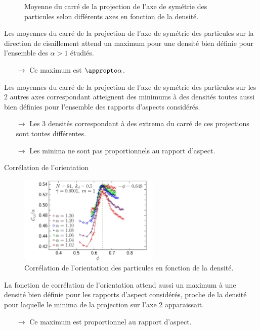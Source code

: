 \documentclass{beamer}
\begin{document}
\begin{figure}[h!]
\begin{subfigure}[t]{0.32\textwidth}
    \end{subfigure}
	\caption{Moyenne du carré de la projection de l'axe de symétrie des particules selon différents axes en fonction de la densité.}
\end{figure}
\vspace{-20pt}
Les moyennes du carré de la projection de l’axe de symétrie des particules sur la direction de cisaillement attend un maximum pour une densité bien définie pour l’ensemble des $\alpha>1$ étudiés.
\begin{itemize}
    \item[$\rightarrow$] Ce maximum est $\appropto \alpha$.
\end{itemize}
Les moyennes du carré de la projection de l’axe de symétrie des particules sur les 2 autres axes correspondant atteignent des minimums à des densités toutes aussi bien définies pour l’ensemble des rapports d’aspects considérés.
\vspace{-17pt}
\begin{itemize}
    \item[$\rightarrow$] Les 3 densités correspondant à des extrema du carré de ces projections sont toutes différentes.
    \item[$\rightarrow$] Les minima ne sont pas proportionnels au rapport d’aspect.
\end{itemize}

\begin{frame}{Corrélation de l'orientation}

\begin{figure}[h!]
\includegraphics[width=0.6\textwidth]{orijal_phi_prolate_0064_KDk500_Ml100_GDh100}
\caption{Corrélation de l'orientation des particules en fonction de la densité.}
\end{figure}
\vspace{-10pt}
La fonction de corrélation de l’orientation attend aussi un maximum à une densité bien définie pour les rapports d’aspect considérés, proche de la densité pour laquelle le minima de la projection sur l’axe 2 apparaissait.
\begin{itemize}
\item[$\rightarrow$] Ce maximum est proportionnel au rapport d’aspect.
\end{itemize}

\end{frame}
\end{document}
